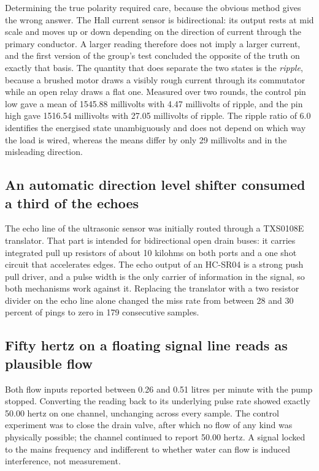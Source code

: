 Determining the true polarity required care, because the obvious method gives the wrong answer. The Hall current sensor is bidirectional: its output rests at mid scale and moves up or down depending on the direction of current through the primary conductor. A larger reading therefore does not imply a larger current, and the first version of the group's test concluded the opposite of the truth on exactly that basis. The quantity that does separate the two states is the \emph{ripple}, because a brushed motor draws a visibly rough current through its commutator while an open relay draws a flat one. Measured over two rounds, the control pin low gave a mean of 1545.88 millivolts with 4.47 millivolts of ripple, and the pin high gave 1516.54 millivolts with 27.05 millivolts of ripple. The ripple ratio of 6.0 identifies the energised state unambiguously and does not depend on which way the load is wired, whereas the means differ by only 29 millivolts and in the misleading direction.

\subsection{An automatic direction level shifter consumed a third of the echoes}

The echo line of the ultrasonic sensor was initially routed through a TXS0108E translator. That part is intended for bidirectional open drain buses: it carries integrated pull up resistors of about 10 kilohms on both ports and a one shot circuit that accelerates edges. The echo output of an HC-SR04 is a strong push pull driver, and a pulse width is the only carrier of information in the signal, so both mechanisms work against it. Replacing the translator with a two resistor divider on the echo line alone changed the miss rate from between 28 and 30 percent of pings to zero in 179 consecutive samples.

\subsection{Fifty hertz on a floating signal line reads as plausible flow}

Both flow inputs reported between 0.26 and 0.51 litres per minute with the pump stopped. Converting the reading back to its underlying pulse rate showed exactly 50.00 hertz on one channel, unchanging across every sample. The control experiment was to close the drain valve, after which no flow of any kind was physically possible; the channel continued to report 50.00 hertz. A signal locked to the mains frequency and indifferent to whether water can flow is induced interference, not measurement.

